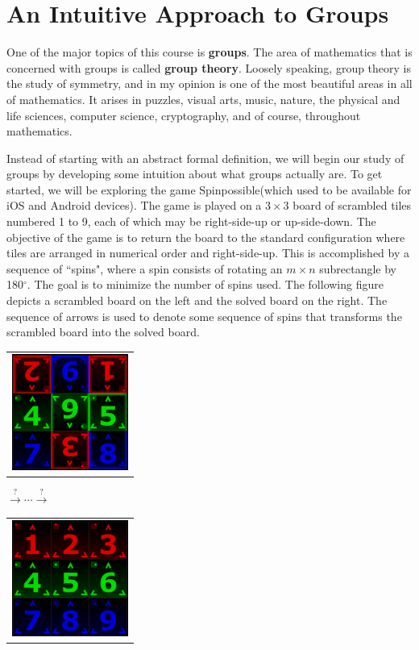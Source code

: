 \chapter{An Intuitive Approach to Groups}
\label{chapter:intuitive_approach_groups}
\thispagestyle{empty}

One of the major topics of this course is \textbf{groups}.  The area of mathematics that is concerned with groups is called \textbf{group theory}. Loosely speaking, group theory is the study of symmetry, and in my opinion is one of the most beautiful areas in all of mathematics. It arises in puzzles, visual arts, music, nature, the physical and life sciences, computer science, cryptography, and of course, throughout mathematics.

Instead of starting with an abstract formal definition, we will begin our study of groups by developing some intuition about what groups actually are.  To get started, we will be exploring the game Spinpossible\texttrademark (which used to be available for iOS and Android devices).  The game is played on a $3\times 3$ board of scrambled tiles numbered 1 to 9, each of which may be right-side-up or up-side-down. The objective of the game is to return the board to the standard configuration where tiles are arranged in numerical order and right-side-up. This is accomplished by a sequence of ``spins", where a spin consists of rotating an $m\times n$ subrectangle by 180$^\circ$. The goal is to minimize the number of spins used.  The following figure depicts a scrambled board on the left and the solved board on the right.  The sequence of arrows is used to denote some sequence of spins that transforms the scrambled board into the solved board.

\begin{center}
\begin{tabular}{c}\includegraphics[width=1.5in]{scramble1.PNG}\end{tabular}
{\large $\xrightarrow{?} \cdots \xrightarrow{?}$}
\begin{tabular}{c}\includegraphics[width=1.5in]{scramble4.PNG}\end{tabular}
\end{center}

